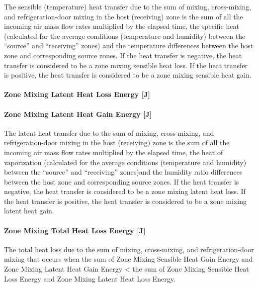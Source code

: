 The sensible (temperature) heat transfer due to the sum of mixing, cross-mixing, and refrigeration-door mixing in the host (receiving) zone is the sum of all the incoming air mass flow rates multiplied by the elapsed time, the specific heat (calculated for the average conditions (temperature and humidity) between the ``source'' and ``receiving'' zones) and the temperature differences between the host zone and corresponding source zones. If the heat transfer is negative, the heat transfer is considered to be a zone mixing sensible heat loss. If the heat transfer is positive, the heat transfer is considered to be a zone mixing sensible heat gain.

\paragraph{Zone Mixing Latent Heat Loss Energy {[}J{]}}\label{zone-mixing-latent-heat-loss-energy-j-2}

\paragraph{Zone Mixing Latent Heat Gain Energy {[}J{]}}\label{zone-mixing-latent-heat-gain-energy-j-2}

The latent heat transfer due to the sum of mixing, cross-mixing, and refrigeration-door mixing in the host (receiving) zone is the sum of all the incoming air mass flow rates multiplied by the elapsed time, the heat of vaporization (calculated for the average conditions (temperature and humidity) between the ``source'' and ``receiving'' zones)and the humidity ratio differences between the host zone and corresponding source zones. If the heat transfer is negative, the heat transfer is considered to be a zone mixing latent heat loss. If the heat transfer is positive, the heat transfer is considered to be a zone mixing latent heat gain.

\paragraph{Zone Mixing Total Heat Loss Energy {[}J{]}}\label{zone-mixing-total-heat-loss-energy-j-2}

The total heat loss due to the sum of mixing, cross-mixing, and refrigeration-door mixing that occurs when the sum of Zone Mixing Sensible Heat Gain Energy and Zone Mixing Latent Heat Gain Energy \textless{} the sum of Zone Mixing Sensible Heat Loss Energy and Zone Mixing Latent Heat Loss Energy.

